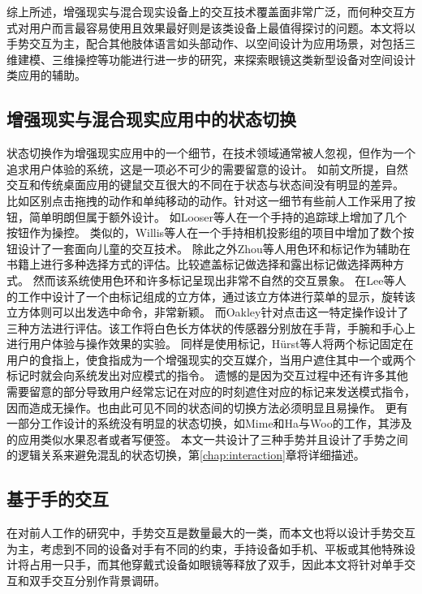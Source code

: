 综上所述，增强现实与混合现实设备上的交互技术覆盖面非常广泛，而何种交互方式对用户而言最容易使用且效果最好则是该类设备上最值得探讨的问题。本文将以手势交互为主，配合其他肢体语言如头部动作、以空间设计为应用场景，对包括三维建模、三维操控等功能进行进一步的研究，来探索眼镜这类新型设备对空间设计类应用的辅助。

\subsection{增强现实与混合现实应用中的状态切换}
\label{sec:related-zhuangtai}
状态切换作为增强现实应用中的一个细节，在技术领域通常被人忽视，但作为一个追求用户体验的系统，这是一项必不可少的需要留意的设计。
如前文所提，自然交互和传统桌面应用的键鼠交互很大的不同在于状态与状态间没有明显的差异。
比如区别点击拖拽的动作和单纯移动的动作。针对这一细节有些前人工作采用了按钮，简单明朗但属于额外设计。
如Looser等人在一个手持的追踪球上增加了几个按钮作为操控。
类似的，Willis等人在一个手持相机投影组的项目中增加了数个按钮设计了一套面向儿童的交互技术。
除此之外Zhou等人用色环和标记作为辅助在书籍上进行多种选择方式的评估。比较遮盖标记做选择和露出标记做选择两种方式。
然而该系统使用色环和许多标记呈现出非常不自然的交互景象。
在Lee等人的工作中设计了一个由标记组成的立方体，通过该立方体进行菜单的显示，旋转该立方体则可以出发选中命令，非常新颖。
而Oakley针对点击这一特定操作设计了三种方法进行评估。该工作将白色长方体状的传感器分别放在手背，手腕和手心上进行用户体验与操作效果的实验。
同样是使用标记，H{\"u}rst等人将两个标记固定在用户的食指上，使食指成为一个增强现实的交互媒介，当用户遮住其中一个或两个标记时就会向系统发出对应模式的指令。
遗憾的是因为交互过程中还有许多其他需要留意的部分导致用户经常忘记在对应的时刻遮住对应的标记来发送模式指令，因而造成无操作。也由此可见不同的状态间的切换方法必须明显且易操作。
更有一部分工作设计的系统没有明显的状态切换，如Mime和Ha与Woo的工作，其涉及的应用类似水果忍者或者写便签。
本文一共设计了三种手势并且设计了手势之间的逻辑关系来避免混乱的状态切换，第\ref{chap:interaction}章将详细描述。

\subsection{基于手的交互}
\label{sec:related-shou}
在对前人工作的研究中，手势交互是数量最大的一类，而本文也将以设计手势交互为主，考虑到不同的设备对手有不同的约束，手持设备如手机、平板或其他特殊设计将占用一只手，而其他穿戴式设备如眼镜等释放了双手，因此本文将针对单手交互和双手交互分别作背景调研。

